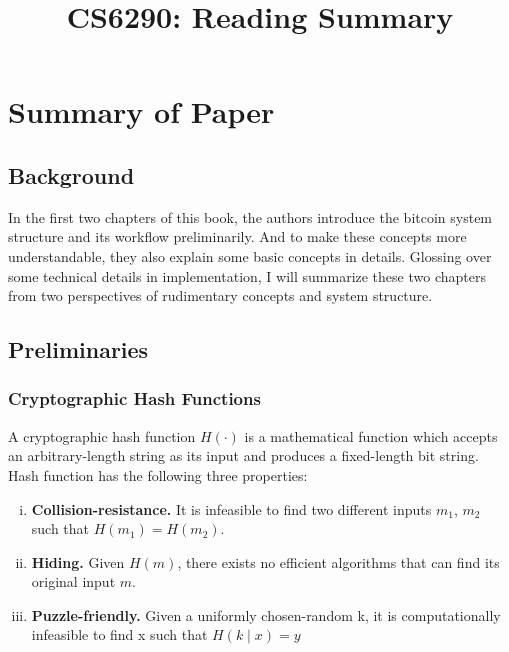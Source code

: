 \documentclass[conference]{IEEEtran}
\begin{document}
\title{CS6290: Reading Summary}

\author{
}

\maketitle

\section{Summary of Paper\cite{cryptobook}}

\subsection{Background}
In the first two chapters of this book\cite{cryptobook}, the authors introduce the bitcoin system structure and its workflow preliminarily.
%
And to make these concepts more understandable, they also explain some basic concepts in details.
%
Glossing over some technical details in implementation, I will summarize these two chapters from two perspectives of rudimentary concepts and system structure.

\subsection{Preliminaries}
\subsubsection{Cryptographic Hash Functions}
A cryptographic hash function $H(\cdot)$ is a mathematical function which accepts an arbitrary-length string as its input and produces a fixed-length bit string.
%
Hash function has the following three properties:

\begin{enumerate}[(i)]
    \item \textbf{Collision-resistance.} It is infeasible to find two different inputs $m_{1}$, $m_{2}$ such that $H(m_1) = H(m_2)$.
    \item \textbf{Hiding.} Given $H(m)$, there exists no efficient algorithms that can find its original input $m$.
    \item \textbf{Puzzle-friendly.} Given a uniformly chosen-random k, it is computationally infeasible to find x such that $H(k \mid x) = y$ 
\end{enumerate}
\end{document}

